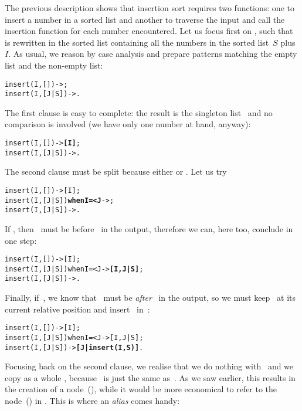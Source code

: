 The previous description shows that insertion sort requires two
functions: one to insert a number in a sorted list and another to
traverse the input and call the insertion function for each number
encountered. Let us focus first on , such that
 is rewritten in the sorted list
containing all the numbers in the sorted list~\(S\) plus~\(I\). As
usual, we reason by case analysis and prepare patterns matching the
empty list and the non\hyp{}empty list:
\begin{alltt}
insert(I,   []) -> \fbcode{[J|insert(I,S)]};
insert(I,[J|S]) -> \fbcode{[J|insert(I,S)]}.
\end{alltt}
The first clause is easy to complete: the result is the singleton
list~\erlcode{[I]} and no comparison is involved (we have only one
number at hand, anyway):
\begin{alltt}
insert(I,   []) -> \textbf{[I]};
insert(I,[J|S]) -> \fbcode{[J|insert(I,S)]}.
\end{alltt}
The second clause must be split because either  or
. Let us try
\begin{alltt}
insert(I,   [])             -> [I];
insert(I,[J|S]) \textbf{when I =< J} -> \fbcode{[J|insert(I,S)]};
insert(I,[J|S])             -> \fbcode{[J|insert(I,S)]}.
\end{alltt}
If , then~ must be before~ in
the output, therefore we can, here too, conclude in one step:
\begin{alltt}
insert(I,   [])             -> [I];
insert(I,[J|S]) when I =< J -> \textbf{[I,J|S]};
insert(I,[J|S])             -> \fbcode{[J|insert(I,S)]}.
\end{alltt}
Finally, if~, we know that ~must be
\emph{after}~ in the output, so we must keep~ at
its current relative position and insert~ in~:
\begin{alltt}
insert(I,   [])             -> [I];
insert(I,[J|S]) when I =< J -> [I,J|S];
insert(I,[J|S])             -> \textbf{[J|insert(I,S)]}.
\end{alltt}
Focusing back on the second clause, we realise that we do nothing
with~ and we copy as a whole \erlcode{[J|S]}, because
\erlcode{[I,J|S]}~is just the same as~\erlcode{[I|[J|S]]}. As we saw
earlier, this results in the creation of a node~(\erlcode{|}), while
it would be more economical to refer to the node~(\erlcode{|}) in
\erlcode{[J|S]}. This is where an \emph{alias} comes handy:
